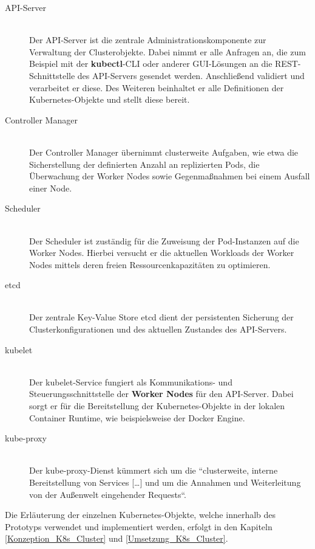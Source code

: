 \begin{description}
	\item[API-Server] \hfill \\
	Der \ac{API}-Server ist die zentrale Administrationskomponente zur Verwaltung der Clusterobjekte. Dabei nimmt er alle Anfragen an, die zum Beispiel mit der \textbf{kubectl}-\ac{CLI} oder anderer \ac{GUI}-Lösungen an die \ac{REST}-Schnittstelle des \ac{API}-Servers gesendet werden. Anschließend validiert und verarbeitet er diese. Des Weiteren beinhaltet er alle Definitionen der Kubernetes-Objekte und stellt diese bereit.\autocite[Vgl.][S. 564-565]{Liebel.2019}
	\item[Controller Manager] \hfill \\
	Der Controller Manager übernimmt clusterweite Aufgaben, wie etwa die Sicherstellung der definierten Anzahl an replizierten Pods, die Überwachung der Worker Nodes sowie Gegenmaßnahmen bei einem Ausfall einer Node.\autocite[Vgl.][S. 565]{Liebel.2019}
	\item[Scheduler] \hfill \\
	Der Scheduler ist zuständig für die Zuweisung der Pod-Instanzen auf die Worker Nodes. Hierbei versucht er die aktuellen Workloads der Worker Nodes mittels deren freien Ressourcenkapazitäten zu optimieren. \autocite[Vgl.][S. 566]{Liebel.2019}
	\item[etcd] \hfill \\
	Der zentrale Key-Value Store etcd dient der persistenten Sicherung der Clusterkonfigurationen und des aktuellen Zustandes des \ac{API}-Servers.
	\item[kubelet] \hfill \\
	Der kubelet-Service fungiert als Kommunikations- und Steuerungsschnittstelle der \textbf{Worker Nodes} für den API-Server. Dabei sorgt er für die Bereitstellung der Kubernetes-Objekte in der lokalen Container Runtime, wie beispielsweise der Docker Engine.\autocite[Vgl.][S. 566-567]{Liebel.2019}
	\item[kube-proxy] \hfill \\
	Der kube-proxy-Dienst kümmert sich um die ``clusterweite, interne Bereitstellung von Services […] und um die Annahmen und Weiterleitung von der Außenwelt eingehender Requests``.\autocite[][S. 568]{Liebel.2019}
\end{description}
Die Erläuterung der einzelnen Kubernetes-Objekte, welche innerhalb des Prototyps verwendet und implementiert werden, erfolgt in den Kapiteln \ref{Konzeption_K8s_Cluster} und \ref{Umsetzung_K8s_Cluster}.\\
